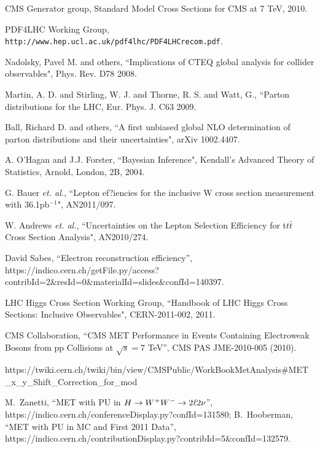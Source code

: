 CMS Generator group, Standard Model Cross Sections for CMS at 7 TeV, 2010.

PDF4LHC Working Group, 
{\tt http://www.hep.ucl.ac.uk/pdf4lhc/PDF4LHCrecom.pdf}.

Nadolsky, Pavel M. and others, ``Implications of CTEQ global analysis for 
collider observables", Phys. Rev. D78 2008.

Martin, A. D. and Stirling, W. J. and Thorne, R. S. and Watt, G., ``Parton 
distributions for the LHC, Eur. Phys. J. C63 2009.

Ball, Richard D. and others, ``A first unbiased global NLO determination 
of parton distributions and their uncertainties", arXiv 1002.4407.

A. O'Hagan and J.J. Forster, ``Bayesian Inference", Kendall's Advanced Theory of Statistics, 
Arnold, London, 2B, 2004.

G. Bauer {\it et. al.}, ``Lepton ef?iencies for the inclusive W cross section measurement with 36.1pb$^{-1}$", AN2011/097.

W. Andrews {\it et. al.}, ``Uncertainties on the Lepton Selection Efficiency for t$t\bar{t}$ Cross Section Analysis", AN2010/274.

David Sabes, ``Electron reconstruction efficiency'', \\
{\small https://indico.cern.ch/getFile.py/access?contribId=2\&resId=0\&materialId=slides\&confId=140397}.

LHC Higgs Cross Section Working Group, ``Handbook of LHC Higgs Cross Sections: 
Inclusive Observables", CERN-2011-002, 2011.

CMS Collaboration, ``CMS MET Performance in Events Containing Electroweak Bosons from pp Collisions at $\sqrt{s}=7$ TeV'', CMS PAS JME-2010-005 (2010).

{\small https://twiki.cern.ch/twiki/bin/view/CMSPublic/WorkBookMetAnalysis\#MET\_x\_y\_Shift\_Correction\_for\_mod}

M.~Zanetti, ``MET with PU in $H\to W^+W^- \to 2\ell 2\nu$'', \\
https://indico.cern.ch/conferenceDisplay.py?confId=131580; 
B.~Hooberman, ``MET with PU in MC and First 2011 Data'', https://indico.cern.ch/contributionDisplay.py?contribId=5\&confId=132579. 

